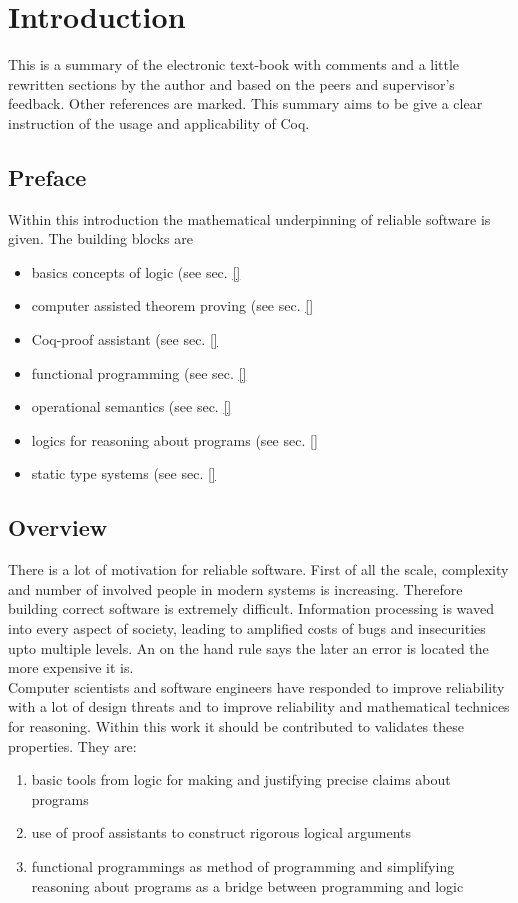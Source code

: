 \section{Introduction}
\label{sec:Introduction}

This is a summary of the electronic text-book \cite{PACGGHSY} with comments and a little rewritten sections by the author and based on the peers and supervisor's feedback. 
Other references are marked. 
This summary aims to be give a clear instruction of the usage and applicability of Coq.\\

\subsection{Preface}
\label{subsec:preface}

Within this introduction the mathematical underpinning of reliable software is given.
The building blocks are
\begin{itemize}
\item basics concepts of logic (see sec. \ref{} %
\item computer assisted theorem proving (see sec. \ref{} %
\item Coq-proof assistant (see sec. \ref{} %
\item functional programming (see sec. \ref{} %
\item operational semantics (see sec. \ref{} %
\item logics for reasoning about programs (see sec. \ref{} %
\item static type systems (see sec. \ref{} %
\end{itemize} 


\subsection{Overview}
\label{subsec:Overview}

There is a lot of motivation for reliable software. 
First of all the scale, complexity and number of involved people in modern systems is increasing.
Therefore building correct software is extremely difficult.
Information processing is waved into every aspect of society, leading to amplified costs of bugs and insecurities upto multiple levels. An on the hand rule says the later an error is located the more expensive it is.\\
Computer scientists and software engineers have responded to improve reliability with a lot of design threats and to improve reliability and mathematical technices for reasoning.
Within this work it should be contributed to validates these properties. 
They are:
\begin{enumerate}
\item basic tools from logic for making and justifying precise claims about programs
\item use of proof assistants to construct rigorous logical arguments
\item functional programmings as method of programming and simplifying reasoning about programs as a bridge between programming and logic
\end{enumerate}



